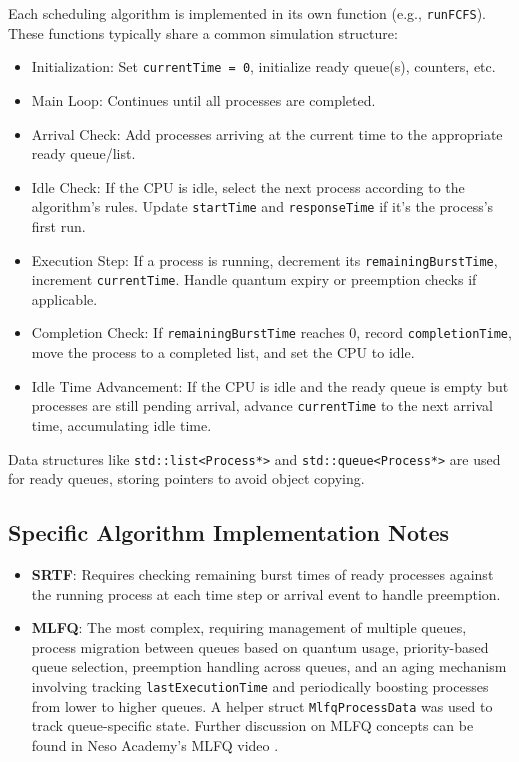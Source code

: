 \documentclass[12pt]{article}
\begin{document}
Each scheduling algorithm is implemented in its own function (e.g., \texttt{runFCFS}). These functions typically share a common simulation structure:
\begin{itemize}
    \item Initialization: Set \texttt{currentTime = 0}, initialize ready queue(s), counters, etc.
    \item Main Loop: Continues until all processes are completed.
    \item Arrival Check: Add processes arriving at the current time to the appropriate ready queue/list.
    \item Idle Check: If the CPU is idle, select the next process according to the algorithm's rules. Update \texttt{startTime} and \texttt{responseTime} if it's the process's first run.
    \item Execution Step: If a process is running, decrement its \texttt{remainingBurstTime}, increment \texttt{currentTime}. Handle quantum expiry or preemption checks if applicable.
    \item Completion Check: If \texttt{remainingBurstTime} reaches 0, record \texttt{completionTime}, move the process to a completed list, and set the CPU to idle.
    \item Idle Time Advancement: If the CPU is idle and the ready queue is empty but processes are still pending arrival, advance \texttt{currentTime} to the next arrival time, accumulating idle time.
\end{itemize}
Data structures like \texttt{std::list<Process*>} and \texttt{std::queue<Process*>} are used for ready queues, storing pointers to avoid object copying.

\subsection{Specific Algorithm Implementation Notes}
\begin{itemize}
    \item \textbf{SRTF}: Requires checking remaining burst times of ready processes against the running process at each time step or arrival event to handle preemption.
    \item \textbf{MLFQ}: The most complex, requiring management of multiple queues, process migration between queues based on quantum usage, priority-based queue selection, preemption handling across queues, and an aging mechanism involving tracking \texttt{lastExecutionTime} and periodically boosting processes from lower to higher queues. A helper struct \texttt{MlfqProcessData} was used to track queue-specific state. Further discussion on MLFQ concepts can be found in Neso Academy's MLFQ video \citep{nacademy}.
\end{itemize}
\end{document}

